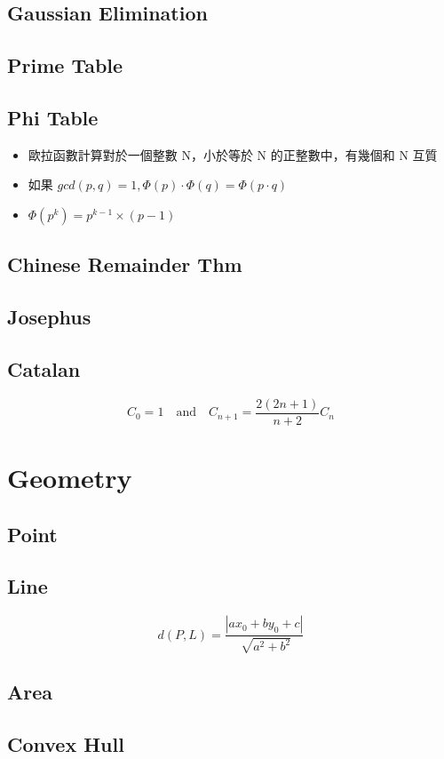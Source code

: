     \subsection{Gaussian Elimination}
        
    \subsection{Prime Table}
        
    \subsection{Phi Table}
        \begin{itemize}
            \item 歐拉函數計算對於一個整數 N，小於等於 N 的正整數中，有幾個和 N 互質
            \item 如果 $gcd(p, q) = 1, \Phi(p) \cdot \Phi(q) = \Phi(p \cdot q)$
            \item $\Phi(p^k) = p^{k - 1} \times (p - 1)$
        \end{itemize}
        
    \subsection{Chinese Remainder Thm}
        
    \subsection{Josephus}
        
    \subsection{Catalan}
        \[C_0 = 1 \quad \mbox{and} \quad C_{n+1}=\frac{2(2n+1)}{n+2}C_n\]
        

\section{Geometry}
    \subsection{Point}
        
    \subsection{Line}
        
        \[d(P, L) = \frac{|ax_0 + by_0 + c|}{\sqrt[]{a^2 + b^2}}\]
    \subsection{Area}
        
    \subsection{Convex Hull}
        